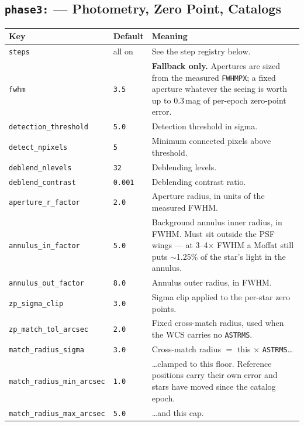 \documentclass[11pt,a4paper]{article}
\begin{document}
\subsection{\texttt{phase3:} --- Photometry, Zero Point, Catalogs}
\begin{center}
\begin{longtable}{|p{4.6cm}|p{1.9cm}|p{8.0cm}|}
\hline
\textbf{Key} & \textbf{Default} & \textbf{Meaning} \\
\hline
\endhead
\texttt{steps} & all on & See the step registry below. \\
\hline
\texttt{fwhm} & \texttt{3.5} & \textbf{Fallback only.} Apertures are sized from the measured \texttt{FWHMPX}; a fixed aperture whatever the seeing is worth up to 0.3\,mag of per-epoch zero-point error. \\
\hline
\texttt{detection\_threshold} & \texttt{5.0} & Detection threshold in sigma. \\
\hline
\texttt{detect\_npixels} & \texttt{5} & Minimum connected pixels above threshold. \\
\hline
\texttt{deblend\_nlevels} & \texttt{32} & Deblending levels. \\
\hline
\texttt{deblend\_contrast} & \texttt{0.001} & Deblending contrast ratio. \\
\hline
\texttt{aperture\_r\_factor} & \texttt{2.0} & Aperture radius, in units of the measured FWHM. \\
\hline
\texttt{annulus\_in\_factor} & \texttt{5.0} & Background annulus inner radius, in FWHM. Must sit outside the PSF wings --- at 3--4$\times$ FWHM a Moffat still puts $\sim$1.25\% of the star's light in the annulus. \\
\hline
\texttt{annulus\_out\_factor} & \texttt{8.0} & Annulus outer radius, in FWHM. \\
\hline
\texttt{zp\_sigma\_clip} & \texttt{3.0} & Sigma clip applied to the per-star zero points. \\
\hline
\texttt{zp\_match\_tol\_arcsec} & \texttt{2.0} & Fixed cross-match radius, used when the WCS carries no \texttt{ASTRMS}. \\
\hline
\texttt{match\_radius\_sigma} & \texttt{3.0} & Cross-match radius $=$ this $\times$ \texttt{ASTRMS}\ldots \\
\hline
\texttt{match\_radius\_min\_arcsec} & \texttt{1.0} & \ldots clamped to this floor. Reference positions carry their own error and stars have moved since the catalog epoch. \\
\hline
\texttt{match\_radius\_max\_arcsec} & \texttt{5.0} & \ldots and this cap. \\

\end{longtable}
\end{center}
\end{document}
